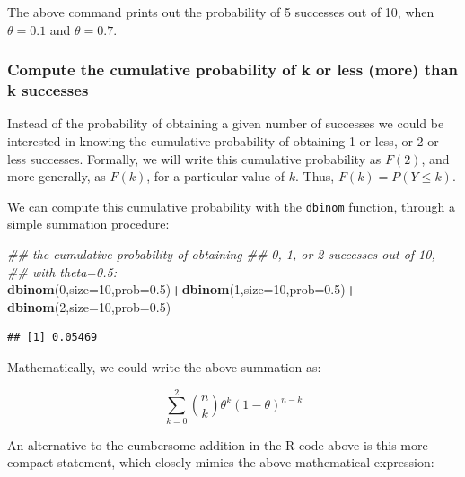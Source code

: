 \documentclass[12pt,]{krantz}
\newenvironment{Shaded}{\begin{snugshade}}{\end{snugshade}}
\newcommand{\CommentTok}[1]{\textcolor[rgb]{0.56,0.35,0.01}{\textit{#1}}}
\newcommand{\DataTypeTok}[1]{\textcolor[rgb]{0.13,0.29,0.53}{#1}}
\newcommand{\DecValTok}[1]{\textcolor[rgb]{0.00,0.00,0.81}{#1}}
\newcommand{\FloatTok}[1]{\textcolor[rgb]{0.00,0.00,0.81}{#1}}
\newcommand{\KeywordTok}[1]{\textcolor[rgb]{0.13,0.29,0.53}{\textbf{#1}}}
\newcommand{\NormalTok}[1]{#1}
\newcommand{\OperatorTok}[1]{\textcolor[rgb]{0.81,0.36,0.00}{\textbf{#1}}}
\newcommand{\StringTok}[1]{\textcolor[rgb]{0.31,0.60,0.02}{#1}}
\begin{document}
The above command prints out the probability of 5 successes out of 10, when \(\theta=0.1\) and \(\theta=0.7\).

\hypertarget{compute-the-cumulative-probability-of-k-or-less-more-than-k-successes}{%
\subsubsection{Compute the cumulative probability of k or less (more) than k successes}\label{compute-the-cumulative-probability-of-k-or-less-more-than-k-successes}}

Instead of the probability of obtaining a given number of successes we could be interested in knowing the cumulative probability of obtaining 1 or less, or 2 or less successes. Formally, we will write this cumulative probability as \(F(2)\), and more generally, as \(F(k)\), for a particular value of \(k\). Thus, \(F(k)=P(Y\leq k)\).

We can compute this cumulative probability with the \texttt{dbinom} function, through a simple summation procedure:

\begin{Shaded}
\begin{Highlighting}[]
\CommentTok{## the cumulative probability of obtaining}
\CommentTok{## 0, 1, or 2 successes out of 10,}
\CommentTok{## with theta=0.5:}
\KeywordTok{dbinom}\NormalTok{(}\DecValTok{0}\NormalTok{,}\DataTypeTok{size=}\DecValTok{10}\NormalTok{,}\DataTypeTok{prob=}\FloatTok{0.5}\NormalTok{)}\OperatorTok{+}\KeywordTok{dbinom}\NormalTok{(}\DecValTok{1}\NormalTok{,}\DataTypeTok{size=}\DecValTok{10}\NormalTok{,}\DataTypeTok{prob=}\FloatTok{0.5}\NormalTok{)}\OperatorTok{+}
\StringTok{  }\KeywordTok{dbinom}\NormalTok{(}\DecValTok{2}\NormalTok{,}\DataTypeTok{size=}\DecValTok{10}\NormalTok{,}\DataTypeTok{prob=}\FloatTok{0.5}\NormalTok{)}
\end{Highlighting}
\end{Shaded}

\begin{verbatim}
## [1] 0.05469
\end{verbatim}

Mathematically, we could write the above summation as:

\begin{equation}
\sum_{k=0}^2 \binom{n}{k} \theta^{k} (1-\theta)^{n-k} 
\end{equation}

An alternative to the cumbersome addition in the R code above is this more compact statement, which closely mimics the above mathematical expression:
\end{document}
